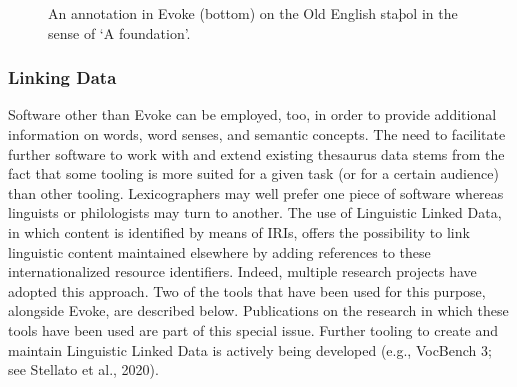 \begin{figure}[htbp]
	\caption[]{\label{fig:Stolk2021a:Fig10} An annotation in Evoke (bottom) on the Old English staþol in the sense of ‘A foundation’.}
\end{figure}

\subsubsection{Linking Data}
Software other than Evoke can be employed, too, in order to provide additional information on words, word senses, and semantic concepts. The need to facilitate further software to work with and extend existing thesaurus data stems from the fact that some tooling is more suited for a given task (or for a certain audience) than other tooling.  Lexicographers may well prefer one piece of software whereas linguists or philologists may turn to another. The use of Linguistic Linked Data, in which content is identified by means of IRIs, offers the possibility to link linguistic content maintained elsewhere by adding references to these internationalized resource identifiers. Indeed, multiple research projects have adopted this approach. Two of the tools that have been used for this purpose, alongside Evoke, are described below. Publications on the research in which these tools have been used are part of this special issue. Further tooling to create and maintain Linguistic Linked Data is actively being developed (e.g., VocBench 3; see Stellato et al., 2020).

